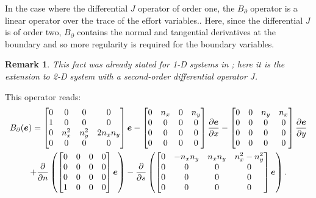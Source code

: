 \documentclass[preprint,12pt]{elsarticle}
\newtheorem{remark}{Remark}
\begin{document}
In the case where the differential $J$ operator of order one, the $B_{\partial}$ operator is  a linear operator over the trace of the effort variables.. Here, since the differential $J$ is of order two,  $B_{\partial}$ contains the normal and tangential derivatives at the boundary and so more regularity is required for the boundary variables.
\begin{remark}
This fact was already stated for 1-D systems in \cite{LeGorrec2005}; here it is the extension to  2-D system with a second-order differential operator $J$.
\end{remark}
This operator reads:
\begin{multline}
	B_{\partial}(\bm{e}) = 
	\begin{bmatrix}
	0 & 0 & 0 & 0 \\
	1 & 0 & 0 & 0 \\
	0 & n_x^2 & n_y^2 & 2 n_x n_y \\
	0 & 0 & 0 & 0 \\
	\end{bmatrix}\bm{e}  - 
	\begin{bmatrix}
	0 & n_x  & 0 & n_y  \\
	0 & 0 & 0 & 0 \\
	0 & 0 & 0 & 0 \\
	0 & 0 & 0 & 0 \\
	\end{bmatrix}\diffp{\bm{e}}{x} -
	\begin{bmatrix}
	0 & 0 & n_y & n_x  \\
	0 & 0 & 0 & 0 \\
	0 & 0 & 0 & 0 \\
	0 & 0 & 0 & 0 \\
	\end{bmatrix}\diffp{\bm{e}}{y} \\
	+ \diffp{}{n}\left(
	\begin{bmatrix}
	0 & 0 & 0 & 0 \\
	0 & 0 & 0 & 0 \\
	0 & 0 & 0 & 0 \\
	1 & 0 & 0 & 0 \\
	\end{bmatrix} \bm{e} \right) - \diffp{}{s}\left(
	\begin{bmatrix}
	0 & - n_x n_y & n_x n_y & n_x^2-n_y^2 \\
	0 & 0 & 0 & 0 \\
	0 & 0 & 0 & 0 \\
	0 & 0 & 0 & 0 \\
	\end{bmatrix} \bm{e} \right).
\end{multline}
\end{document}
